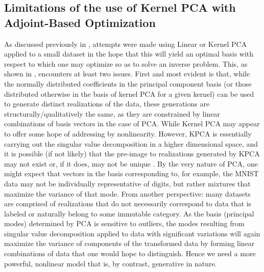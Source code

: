 \documentclass{article}
\begin{document}
\subsection{Limitations of the use of Kernel PCA with Adjoint-Based Optimization }\label{limkpca}
	As discussed previously in \label{intokpca}, attempts were made using Linear or Kernel PCA applied to a small dataset in the hope that this will yield an optimal basis with respect to which one may optimize so as to solve an inverse problem.  This, as shown in \label{KDEPCA}, encounters at least two issues.  First and most evident is that, while the normally distributed coefficients in the principal component basis (or those distributed otherwise in the basis of kernel PCA for a given kernel) can be used to generate distinct realizations of the data, these generations are structurally/qualitatively the same, as they are constrained by linear combinations of basis vectors in the case of PCA.  While Kernel PCA may appear to offer some hope of addressing by nonlinearity.  However, KPCA is essentially carrying out the singular value decomposition in a higher dimensional space, and it is possible (if not likely) that the pre-image to realizations generated by KPCA may not exist or, if it does, may not be unique \cite{Scholkopf1997KernelAnalysis}.  By the very nature of PCA, one might expect that vectors in the basis corresponding to, for example, the MNIST data may not be individually representative of digits, but rather mixtures that maximize the variance of that mode.  From another perspective: many datasets are comprised of realizations that do not necessarily correspond to data that is labeled or naturally belong to some immutable category. As the basis (principal modes) determined by PCA is sensitive to outliers, the modes resulting from singular value decomposition applied to data with significant variations will again maximize the variance of components of the transformed data by forming linear combinations of data that one would hope to distinguish. Hence we need a more powerful, nonlinear model that is, by contrast, generative in nature. 
\end{document}
